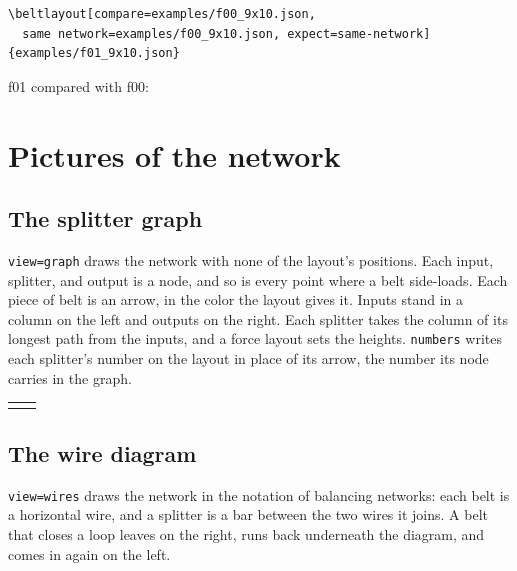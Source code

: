 \documentclass[11pt]{article}
\newcommand\key[1]{\texttt{#1}}
\newenvironment{pictures}[1]{\tagpdfsetup{table/tagging=presentation}\begin{tabular}{#1}}{\end{tabular}}
\begin{document}
	\begin{Verbatim}
\beltlayout[compare=examples/f00_9x10.json,
  same network=examples/f00_9x10.json, expect=same-network]{examples/f01_9x10.json}
	\end{Verbatim}

	\begin{center}
		\par\smallskip
		\small f01 compared with f00: \beltmapcaption
	\end{center}

	\section{Pictures of the network}
	\label{sec:views}

	\subsection{The splitter graph}
	\label{sec:graph}

	\key{view=graph} draws the network with none of the layout's positions. Each input, splitter, and output is a node, and so is every point where a belt side-loads. Each piece of belt is an arrow, in the color the layout gives it. Inputs stand in a column on the left and outputs on the right. Each splitter takes the column of its longest path from the inputs, and a force layout sets the heights. \key{numbers} writes each splitter's number on the layout in place of its arrow, the number its node carries in the graph.

	\begin{center}
		\begin{pictures}{@{}c@{\qquad}c@{}}
			\beltlayout[mix, numbers, labels, tile=3.6mm]{examples/f00_9x10.json}
			&
			\beltlayout[mix, view=graph]{examples/f00_9x10.json}
		\end{pictures}
	\end{center}

	\subsection{The wire diagram}
	\label{sec:wires}

	\key{view=wires} draws the network in the notation of balancing networks: each belt is a horizontal wire, and a splitter is a bar between the two wires it joins. A belt that closes a loop leaves on the right, runs back underneath the diagram, and comes in again on the left.
\end{document}

